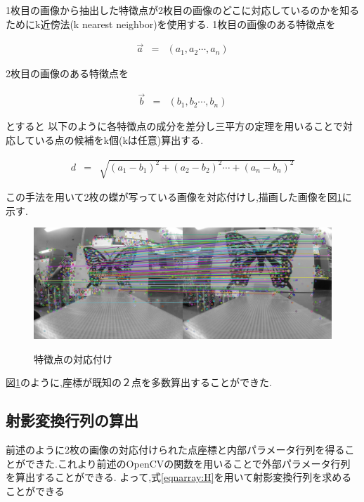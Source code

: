 \documentclass[12pt,oneside]{sotsuken_paper}
\begin{document}
1枚目の画像から抽出した特徴点が2枚目の画像のどこに対応しているのかを知るためにk近傍法(k nearest neighbor)を使用する.
1枚目の画像のある特徴点を

\begin{eqnarray}
	\vec{a}  & = & (a_1, a_2 \cdots, a_n)
\end{eqnarray}

2枚目の画像のある特徴点を

\begin{eqnarray}
	\vec{b}  & = & (b_1, b_2 \cdots, b_n)
\end{eqnarray}

とすると
以下のように各特徴点の成分を差分し三平方の定理を用いることで対応している点の候補をk個(kは任意)算出する.


\begin{eqnarray}
	d & = & \sqrt{(a_1-b_1)^2+ (a_2-b_2)^2 \cdots+ (a_n-b_n)^2}
\end{eqnarray}

この手法を用いて2枚の蝶が写っている画像を対応付けし,描画した画像を図\ref{fig:chou}に示す.

\begin{figure}[htp]
 \begin{center}
  \includegraphics[width=120mm]{img/soft/chou.png}
 　\caption{特徴点の対応付け}
  \label{fig:chou}%
 \end{center}
\end{figure}

図\ref{fig:chou}のように,座標が既知の２点を多数算出することができた.

\subsection{射影変換行列の算出}

前述のように2枚の画像の対応付けられた点座標と内部パラメータ行列を得ることができた.これより前述のOpenCVの関数を用いることで外部パラメータ行列を算出することができる.
よって,式\ref{eqnarray:H}を用いて射影変換行列を求めることができる
\end{document}

